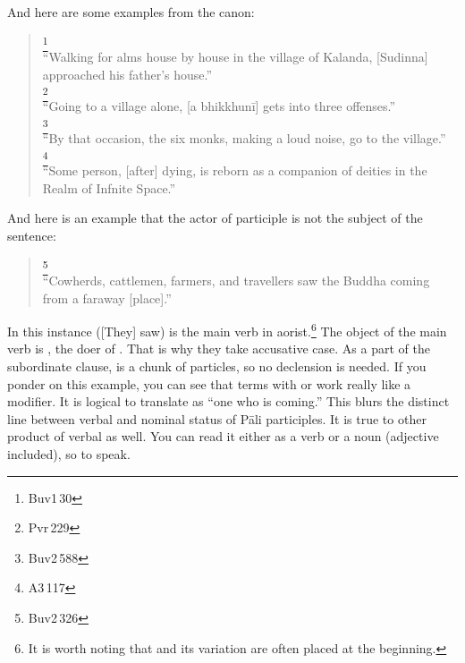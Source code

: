 And here are some examples from the canon:

\begin{quote}
\footnote{Buv1\,30}\\
``Walking for alms house by house in the village of Kalanda, [Sudinna] approached his father's house.''\\[1.5mm]
\footnote{Pvr\,229}\\
``Going to a village alone, [a bhikkhun\=i] gets into three offenses.''\\[1.5mm]
\footnote{Buv2\,588}\\
``By that occasion, the six monks, making a loud noise, go to the village.''\\[1.5mm]
\footnote{A3\,117}\\
``Some person, [after] dying, is reborn as a companion of deities in the Realm of Infnite Space.''\\[1.5mm]
\end{quote}

And here is an example that the actor of participle is not the subject of the sentence:

\begin{quote}
\footnote{Buv2\,326}\\
``Cowherds, cattlemen, farmers, and travellers saw the Buddha coming from a faraway [place].''\\
\end{quote}

In this instance  ([They] saw) is the main verb in aorist.\footnote{It is worth noting that  and its variation are often placed at the beginning.} The object of the main verb is , the doer of . That is why they take accusative case. As a part of the subordinate clause,  is a chunk of particles, so no declension is needed. If you ponder on this example, you can see that terms with  or  work really like a modifier. It is logical to translate  as ``one who is coming.'' This blurs the distinct line between verbal and nominal status of P\=ali participles. It is true to other product of verbal  as well. You can read it either as a verb or a noun (adjective included), so to speak.

